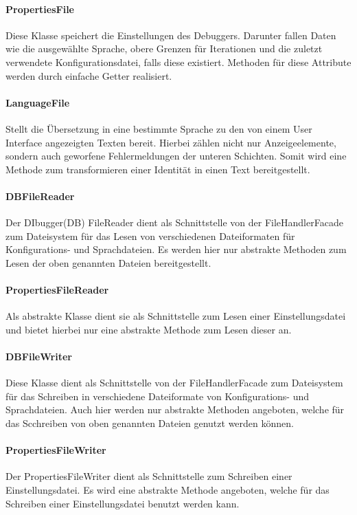 \documentclass[parskip=full]{scrartcl}
\begin{document}
\paragraph{PropertiesFile}
Diese Klasse speichert die Einstellungen des Debuggers.
Darunter fallen Daten wie die ausgewählte Sprache, obere Grenzen für Iterationen und die zuletzt verwendete Konfigurationsdatei, falls diese existiert.
Methoden für diese Attribute werden durch einfache Getter realisiert.
\paragraph{LanguageFile}
Stellt die Übersetzung in eine bestimmte Sprache zu den von einem User Interface angezeigten Texten bereit.
Hierbei zählen nicht nur Anzeigeelemente, sondern auch geworfene Fehlermeldungen der unteren Schichten.
Somit wird eine Methode zum transformieren einer Identität in einen Text bereitgestellt.

\paragraph{DBFileReader}
Der DIbugger(DB) FileReader dient als Schnittstelle von der FileHandlerFacade zum Dateisystem für das Lesen von verschiedenen Dateiformaten für Konfigurations- und Sprachdateien.
Es werden hier nur abstrakte Methoden zum Lesen der oben genannten Dateien bereitgestellt.
\paragraph{PropertiesFileReader}
Als abstrakte Klasse dient sie als Schnittstelle zum Lesen einer Einstellungsdatei und bietet hierbei nur eine abstrakte Methode zum Lesen dieser an.
\paragraph{DBFileWriter}
Diese Klasse dient als Schnittstelle von der FileHandlerFacade zum Dateisystem für das Schreiben in verschiedene Dateiformate von Konfigurations- und Sprachdateien.
Auch hier werden nur abstrakte Methoden angeboten, welche für das Scchreiben von oben genannten Dateien genutzt werden können.
\paragraph{PropertiesFileWriter}
Der PropertiesFileWriter dient als Schnittstelle zum Schreiben einer Einstellungsdatei.
Es wird eine abstrakte Methode angeboten, welche für das Schreiben einer Einstellungsdatei benutzt werden kann.
\end{document}
